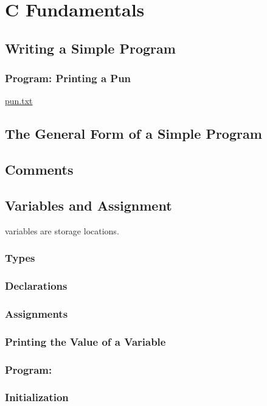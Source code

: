 \documentclass[../main.tex]{subfiles}
\begin{document}
\section{C Fundamentals}

\subsection{Writing a Simple Program}
\subsubsection*{Program: Printing a Pun}

\href{run:.code/a.out}{pun.txt}

\subsection{The General Form of a Simple Program}

\subsection{Comments}

\subsection{Variables and Assignment}

variables are storage locations.

\subsubsection*{Types}


\subsubsection*{Declarations}
\subsubsection*{Assignments}
\subsubsection*{Printing the Value of a Variable}
\subsubsection*{Program: }
\subsubsection*{Initialization }
\end{document}
